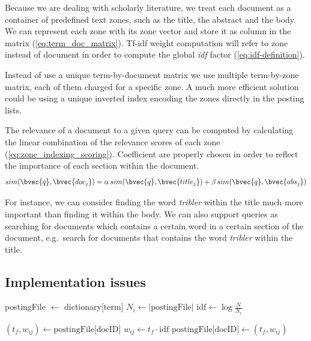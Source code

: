 Because we are dealing with scholarly literature, we treat each document as a container of predefined text zones, such as the title, the abstract and the body. We can represent each zone with its zone vector and store it as column in the matrix (\ref{eq:term_doc_matrix}). Tf-idf weight computation will refer to zone instead of document in order to compute the global \emph{idf} factor (\ref{eq:idf-definition}).

Instead of use a unique term-by-document matrix we use multiple term-by-zone matrix, each of them charged for a specific zone. A much more efficient solution could be using a unique inverted index encoding the zones directly in the posting lists.

The relevance of a document to a given query can be computed by calculating the linear combination of the relevance scores of each zone (\ref{eq:zone_indexing_scoring}). Coefficient are properly chosen in order to reflect the importance of each section within the document. 
\begin{equation} \label{eq:zone_indexing_scoring}
 sim(\bvec{q},\bvec{doc_j}) = \alpha \, sim(\bvec{q}, \bvec{title_j}) + \beta \, sim(\bvec{q}, \bvec{abs_j})
\end{equation}

For instance, we can consider finding the word \emph{tribler} within the title much more important than finding it within the body. We can also support queries as searching for documents which contains a certain word in a certain section of the document, e.g.\ search for documents that contains the word \emph{tribler} within the title.

\subsection{Implementation issues}

\begin{algorithm}
\caption{Global Inverse Document Frequency computation algorithm}%
\begin{algorithmic}[1]
	\State postingFile $\gets$ dictionary[term]
	\State $N_i \gets |\mbox{postingFile}|$ 
	\State $\mbox{idf} \gets \log\frac{N}{N_i}$

		\State $(t_f, w_{ij}) \gets \mbox{postingFile[docID]}$
		\State $w_{ij} \gets t_f \cdot \mbox{idf}$
		\State $\mbox{postingFile[docID]} \gets (t_f, w_{ij})$
	\EndFor
\EndFor
\EndProcedure
\end{algorithmic}
\end{algorithm}

